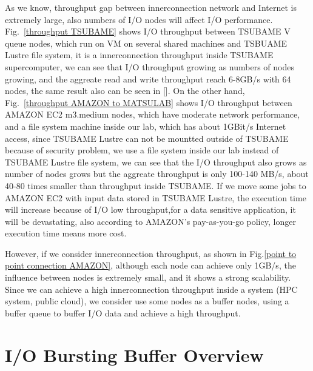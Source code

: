 \documentclass[JIP,draft]{ipsj}
\begin{document}
As we know, throughput gap between innerconnection network and Internet is extremely large, also numbers of I/O nodes will affect I/O performance.
Fig.~\ref{throughput TSUBAME} shows I/O throughput between TSUBAME V queue nodes, which run on VM on several shared machines and TSBUAME Lustre file system, it is a innerconnection throughput inside TSUBAME supercomputer, we can see that I/O throughput growing as numbers of nodes growing, and the aggreate read and write throughput reach 6-8GB/s with 64 nodes, the same result also can be seen in [].
On the other hand, Fig.~\ref{throughput AMAZON to MATSULAB} shows I/O throughput between AMAZON EC2 m3.medium nodes, which have moderate network performance, and a file system machine inside our lab, which has about 1GBit/s Internet access, since TSUBAME Lustre can not be mountted outside of TSUBAME because of security problem, we use a file system inside our lab instead of TSUBAME Lustre file system, we can see that the I/O throughput also grows as number of nodes grows but the aggreate throughput is only 100-140 MB/s, about 40-80 times smaller than throughput inside TSUBAME.
If we move some jobs to AMAZON EC2 with input data stored in TSUBAME Lustre, the execution time will increase because of I/O low throughput,for a data sensitive application, it will be devastating, also according to AMAZON's pay-as-you-go policy, longer execution time means more cost.

However, if we consider innerconnection throughput, as shown in Fig.\ref{point to point connection AMAZON}, although each node can achieve only 1GB/s, the influence between nodes is extremely small, and it shows a strong scalability.
Since we can achieve a high innerconnection throughput inside a system (HPC system, public cloud), we consider use some nodes as a buffer nodes, using a buffer queue to buffer I/O data and achieve a high throughput.

\section{I/O Bursting Buffer Overview}

\end{document}
